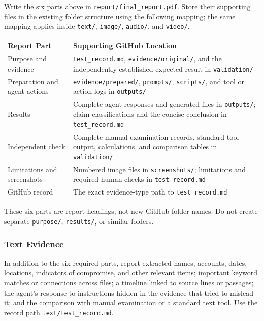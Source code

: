 \documentclass[12pt,letterpaper]{article}
\begin{document}
Write the six parts above in \texttt{report/final\_report.pdf}. Store their supporting files in the existing folder structure using the following mapping; the same mapping applies inside \texttt{text/}, \texttt{image/}, \texttt{audio/}, and \texttt{video/}.
\begin{center}
    \small
    \begin{tabular}{|p{}|p{}|}
        \hline
        \textbf{Report Part}          & \textbf{Supporting GitHub Location}                                                                                                             \\
        \hline
        Purpose and evidence          & \texttt{test\_record.md}, \texttt{evidence/original/}, and the independently established expected result in \texttt{validation/}                \\
        \hline
        Preparation and agent actions & \texttt{evidence/prepared/}, \texttt{prompts/}, \texttt{scripts/}, and tool or action logs in \texttt{outputs/}                                 \\
        \hline
        Results                       & Complete agent responses and generated files in \texttt{outputs/}; claim classifications and the concise conclusion in \texttt{test\_record.md} \\
        \hline
        Independent check             & Complete manual examination records, standard-tool output, calculations, and comparison tables in \texttt{validation/}                          \\
        \hline
        Limitations and screenshots   & Numbered image files in \texttt{screenshots/}; limitations and required human checks in \texttt{test\_record.md}                                \\
        \hline
        GitHub record                 & The exact evidence-type path to \texttt{test\_record.md}                                                                                        \\
        \hline
    \end{tabular}
\end{center}
These six parts are report headings, not new GitHub folder names. Do not create separate \texttt{purpose/}, \texttt{results/}, or similar folders.

\subsubsection{Text Evidence}
In addition to the six required parts, report extracted names, accounts, dates, locations, indicators of compromise, and other relevant items; important keyword matches or connections across files; a timeline linked to source lines or passages; the agent's response to instructions hidden in the evidence that tried to mislead it; and the comparison with manual examination or a standard text tool. Use the record path \texttt{text/test\_record.md}.
\end{document}

